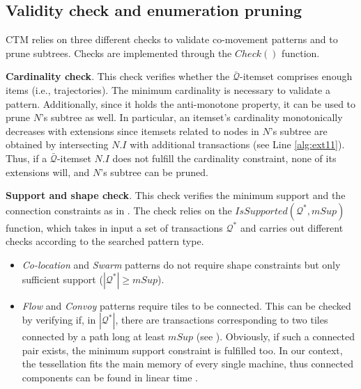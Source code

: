 \documentclass[preprint,12pt,authoryear]{elsarticle} %
\begin{document}
\subsection{Validity check and enumeration pruning} \label{sec:pruning}
CTM relies on three different checks to validate co-movement patterns and to prune subtrees.
Checks are implemented through the $Check()$ function.

\textbf{Cardinality check}.
This check verifies whether the $\bar{\mathcal{Q}}$-itemset comprises enough items (i.e., trajectories).
The minimum cardinality is necessary to validate a pattern.
Additionally, since it holds the anti-monotone property, it can be used to prune $N$'s subtree as well.
In particular, an itemset's cardinality monotonically decreases with extensions since itemsets related to nodes in $N$'s subtree are obtained by intersecting $N.I$ with additional transactions (see  Line \ref{alg:ext11}).
Thus, if a $\bar{\mathcal{Q}}$-itemset $N.I$ does not fulfill the cardinality constraint, none of its extensions will, and $N$'s subtree can be pruned.

\textbf{Support and shape check}.
This check verifies the minimum support and the connection constraints as in .
The check relies on the $IsSupported(\mathcal{Q}^*,mSup)$ function, which takes in input a set of transactions $\mathcal{Q}^*$ and carries out different checks according to the searched pattern type.
\begin{itemize}
\item \textit{Co-location} and \textit{Swarm} patterns do not require shape constraints but only sufficient support ($|\mathcal{Q}^*|\geq mSup$).
\item \textit{Flow} and \textit{Convoy} patterns require tiles to be connected.
This can be checked by verifying if, in $|\mathcal{Q}^*|$, there are transactions corresponding to two tiles connected by a path long at least $mSup$ (see ).
Obviously, if such a connected pair exists, the minimum support constraint is fulfilled too.
In our context, the tessellation fits the main memory of every single machine, thus connected components can be found in linear time \citep{hopcroft1973algorithm}.
\end{itemize}
\end{document}
